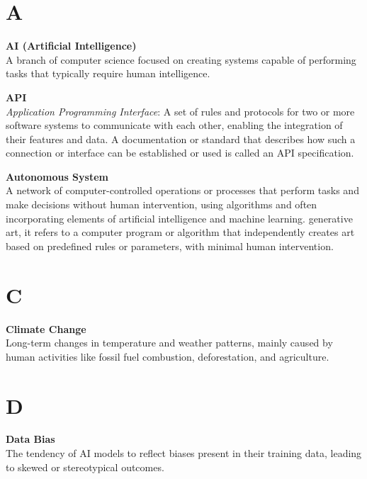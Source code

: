 \section*{A}
\noindent \textbf{AI (Artificial Intelligence)}\\
\noindent A branch of computer science focused on creating systems capable of performing tasks that typically require human intelligence.

\vspace{4mm}

\noindent \textbf{API}\\
\noindent \textit{Application Programming Interface}: A set of rules and protocols for two or more software systems to communicate with each other, enabling the integration of their features and data. A documentation or standard that describes how such a connection or interface can be established or used is called an API specification.

\vspace{4mm}

\noindent \textbf{Autonomous System}\\
\noindent A network of computer-controlled operations or processes that perform tasks and make decisions without human intervention, using algorithms and often incorporating elements of artificial intelligence and machine learning.  generative art, it refers to a computer program or algorithm that independently creates art based on predefined rules or parameters, with minimal human intervention.

\section*{C}
\noindent \textbf{Climate Change}\\
\noindent Long-term changes in temperature and weather patterns, mainly caused by human activities like fossil fuel combustion, deforestation, and agriculture.

\section*{D}
\noindent \textbf{Data Bias}\\
\noindent The tendency of AI models to reflect biases present in their training data, leading to skewed or stereotypical outcomes.

\vspace{4mm}

